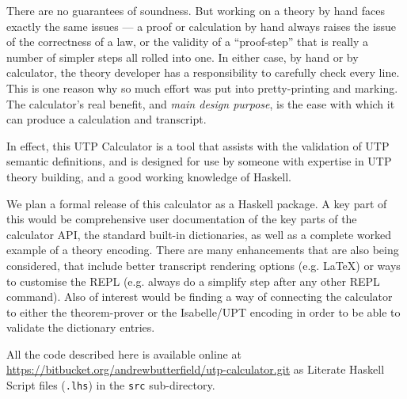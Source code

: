 There are no guarantees of soundness.
But working on a theory by hand faces exactly the same issues
--- a proof or calculation by hand always raises the issue
of the correctness of a law, or the validity of a ``proof-step''
that is really a number of simpler steps all rolled into one.
In either case, by hand or by calculator,
the theory developer has a responsibility to carefully check every line.
This is one reason why so much effort was put into pretty-printing
and marking.
The calculator's real benefit, and\emph{ main design purpose},
is the ease with which
it can produce a calculation and transcript.


In effect, this UTP Calculator is a tool that assists
with the validation of UTP semantic definitions,
and is designed for use by someone with expertise
in UTP theory building,
and a good working knowledge of Haskell.



We plan a formal release of this calculator as a Haskell package.
A key part of this would be comprehensive
user documentation of the key parts of the calculator API,
the standard built-in dictionaries,
as well as a complete worked example of a theory encoding.
There are many enhancements that are also being considered,
that include better transcript rendering options
(e.g. \LaTeX) or ways to customise the REPL
(e.g. always do a simplify step after any other REPL command).
Also of interest would be finding
a way of connecting the calculator
to either the  theorem-prover\cite{DBLP:conf/utp/Butterfield10}
or the Isabelle/UPT encoding\cite{DBLP:conf/utp/FosterZW14}
in order to be able to validate the dictionary entries.

All the code described here is available online
at
\\\url{https://bitbucket.org/andrewbutterfield/utp-calculator.git}
as Literate Haskell Script files (\texttt{.lhs})
in the \texttt{src} sub-directory.
